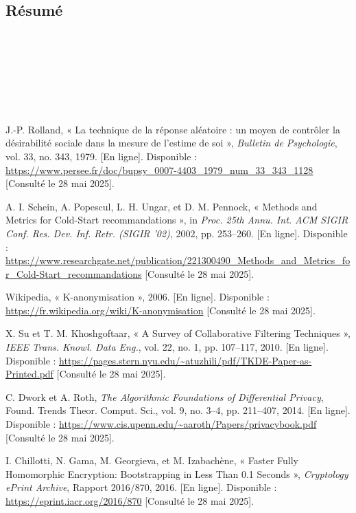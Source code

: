 \documentclass{article}
\begin{document}
\subsection{Résumé}
$ $\\
\\
\\
\\
\\
\\




\newpage
\begin{thebibliography}{99}

    J.-P. Rolland, « La technique de la réponse aléatoire : un moyen de contrôler la désirabilité sociale dans la mesure de l'estime de soi », \emph{Bulletin de Psychologie}, vol. 33, no. 343, 1979. [En ligne]. Disponible : \url{https://www.persee.fr/doc/bupsy_0007-4403_1979_num_33_343_1128} [Consulté le 28 mai 2025].

    A. I. Schein, A. Popescul, L. H. Ungar, et D. M. Pennock, « Methods and Metrics for Cold-Start recommandations », in \emph{Proc. 25th Annu. Int. ACM SIGIR Conf. Res. Dev. Inf. Retr. (SIGIR '02)}, 2002, pp. 253–260. [En ligne]. Disponible : \url{https://www.researchgate.net/publication/221300490_Methods_and_Metrics_for_Cold-Start_recommandations} [Consulté le 28 mai 2025].

    Wikipedia, « K-anonymisation », 2006. [En ligne]. Disponible : \url{https://fr.wikipedia.org/wiki/K-anonymisation} [Consulté le 28 mai 2025].

    X. Su et T. M. Khoshgoftaar, « A Survey of Collaborative Filtering Techniques », \emph{IEEE Trans. Knowl. Data Eng.}, vol. 22, no. 1, pp. 107–117, 2010. [En ligne]. Disponible : \url{https://pages.stern.nyu.edu/~atuzhili/pdf/TKDE-Paper-as-Printed.pdf} [Consulté le 28 mai 2025].

    C. Dwork et A. Roth, \emph{The Algorithmic Foundations of Differential Privacy}, Found. Trends Theor. Comput. Sci., vol. 9, no. 3–4, pp. 211–407, 2014. [En ligne]. Disponible : \url{https://www.cis.upenn.edu/~aaroth/Papers/privacybook.pdf} [Consulté le 28 mai 2025].

    I. Chillotti, N. Gama, M. Georgieva, et M. Izabachène, « Faster Fully Homomorphic Encryption: Bootstrapping in Less Than 0.1 Seconds », \emph{Cryptology ePrint Archive}, Rapport 2016/870, 2016. [En ligne]. Disponible : \url{https://eprint.iacr.org/2016/870} [Consulté le 28 mai 2025].


\end{thebibliography}
\end{document}
